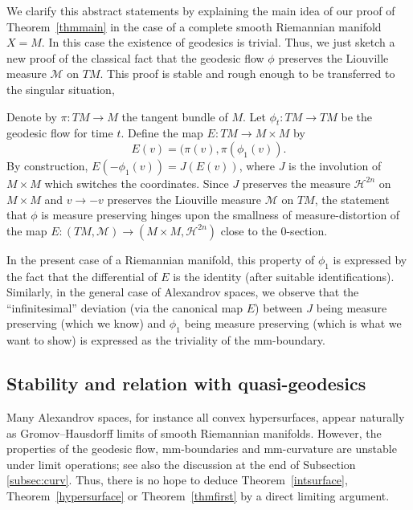 \documentclass[12pt,leqno,intlimits]{amsart}
\numberwithin{equation}{section}
\theoremstyle{definition}
\theoremstyle{remark}
\newcommand{\tref}[1]{Theorem~\ref{#1}}
\def\:{\colon}
\begin{document}
We clarify this abstract statements by explaining the main idea of  our  proof of \tref{thmmain} in the case of a complete smooth Riemannian manifold $X=M$.
In this case the existence of  geodesics is trivial.
Thus, we just sketch a new proof  of the  classical fact   that the geodesic flow $\phi$  preserves the Liouville measure $\mathcal M$ on $TM$.
This proof is stable and rough enough to be transferred to the singular situation,


Denote by $\pi\: TM\to M$ the tangent bundle of $M$.
Let  $\phi_t\: TM\to TM$ be the geodesic flow for time $t$.
Define the map $E\:TM\to M\times M$  by
\[E(v)=(\pi(v), \pi (\phi _1 (v)).\]
By construction, $E(-\phi_1(v))= J(E(v))$,
where $J$ is the involution of $M\times M$ which switches the coordinates.
Since $J$ preserves the measure $\mathcal H^{2n}$ on $M\times M$ and $v\to -v$ preserves the Liouville measure $\mathcal M$ on $TM$,
the statement that $\phi$ is measure preserving hinges upon the smallness of measure-distortion of the map $E \:(TM,\mathcal M) \to (M\times M, \mathcal H^{2n})$ close to the $0$-section.

In the present case of a Riemannian manifold,
this property of $\phi_1$ is expressed by  the fact that the differential of $E$ is the identity (after suitable identifications).
Similarly,
in the general case of Alexandrov spaces, we observe that the ``infinitesimal'' deviation (via the canonical map $E$) between $J$ being measure preserving (which we know) and  $\phi _1$ being measure preserving (which is what we want to show)
is expressed as the triviality of  the mm-boundary.











\subsection{Stability and relation with quasi-geodesics}
Many Alexandrov spaces, for instance all convex hypersurfaces, appear naturally  as Gromov--Hausdorff limits of smooth Riemannian manifolds. However, the properties of the geodesic flow, mm-boundaries and mm-curvature are  unstable under limit operations; see also the discussion at the end of Subsection \ref{subsec:curv}.
Thus, there is no hope to deduce \tref{intsurface}, \tref{hypersurface} or \tref{thmfirst} by a direct limiting argument.
\end{document}
